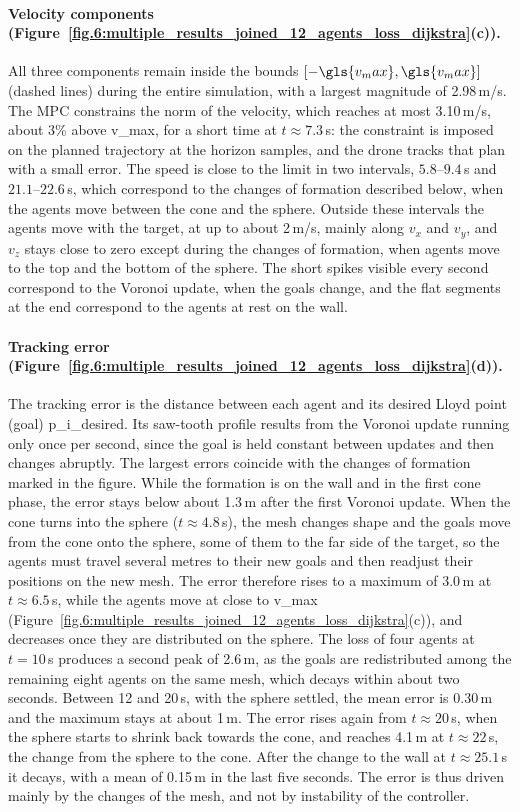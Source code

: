 \paragraph{Velocity components (Figure~\ref{fig.6:multiple_results_joined_12_agents_loss_dijkstra}(c)).}
All three components remain inside the bounds $[-\gls{v_max}, \gls{v_max}]$ (dashed lines) during the entire simulation, with a largest magnitude of 2.98\,m/s. The \gls{MPC} constrains the norm of the velocity, which reaches at most 3.10\,m/s, about 3\% above \gls{v_max}, for a short time at $t\approx7.3$\,s: the constraint is imposed on the planned trajectory at the horizon samples, and the drone tracks that plan with a small error. The speed is close to the limit in two intervals, $5.8$--$9.4$\,s and $21.1$--$22.6$\,s, which correspond to the changes of formation described below, when the agents move between the cone and the sphere. Outside these intervals the agents move with the target, at up to about 2\,m/s, mainly along $v_x$ and $v_y$, and $v_z$ stays close to zero except during the changes of formation, when agents move to the top and the bottom of the sphere. The short spikes visible every second correspond to the Voronoi update, when the goals change, and the flat segments at the end correspond to the agents at rest on the wall.

\paragraph{Tracking error (Figure~\ref{fig.6:multiple_results_joined_12_agents_loss_dijkstra}(d)).}
The tracking error is the distance between each agent and its desired Lloyd point (goal) \gls{p_i_desired}. Its saw-tooth profile results from the Voronoi update running only once per second, since the goal is held constant between updates and then changes abruptly. The largest errors coincide with the changes of formation marked in the figure. While the formation is on the wall and in the first cone phase, the error stays below about 1.3\,m after the first Voronoi update. When the cone turns into the sphere ($t\approx4.8$\,s), the mesh changes shape and the goals move from the cone onto the sphere, some of them to the far side of the target, so the agents must travel several metres to their new goals and then readjust their positions on the new mesh. The error therefore rises to a maximum of 3.0\,m at $t\approx6.5$\,s, while the agents move at close to \gls{v_max} (Figure~\ref{fig.6:multiple_results_joined_12_agents_loss_dijkstra}(c)), and decreases once they are distributed on the sphere. The loss of four agents at $t=10$\,s produces a second peak of 2.6\,m, as the goals are redistributed among the remaining eight agents on the same mesh, which decays within about two seconds. Between 12 and 20\,s, with the sphere settled, the mean error is 0.30\,m and the maximum stays at about 1\,m. The error rises again from $t\approx20$\,s, when the sphere starts to shrink back towards the cone, and reaches 4.1\,m at $t\approx22$\,s, the change from the sphere to the cone. After the change to the wall at $t\approx25.1$\,s it decays, with a mean of 0.15\,m in the last five seconds. The error is thus driven mainly by the changes of the mesh, and not by instability of the controller.

